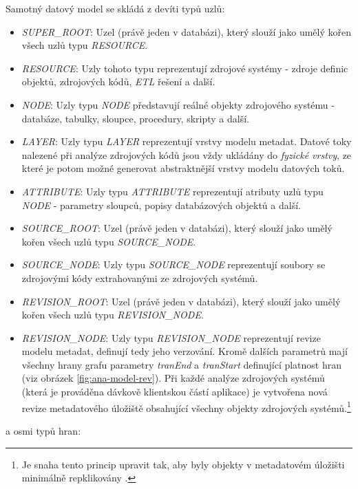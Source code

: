 Samotný datový model se skládá z devíti typů uzlů:

\begin{itemize}
	\item{\textit{SUPER\_ROOT}}: Uzel (právě jeden v databázi), který slouží jako umělý kořen všech uzlů typu \textit{RESOURCE}.
	\item{\textit{RESOURCE}}: Uzly tohoto typu reprezentují zdrojové systémy - zdroje definic objektů, zdrojových kódů, \textit{ETL} řešení a další.
	\item{\textit{NODE}}: Uzly typu \textit{NODE} představují reálné objekty zdrojového systému - databáze, tabulky, sloupce, procedury, skripty a další.
	\item{\textit{LAYER}}: Uzly typu \textit{LAYER} reprezentují vrstvy modelu metadat. Datové toky nalezené při analýze zdrojových kódů jsou vždy ukládány do \textit{fyzické vrstvy}, ze které je potom možné generovat abstraktnější vrstvy modelu datových toků.
	\item{\textit{ATTRIBUTE}}: Uzly typu \textit{ATTRIBUTE} reprezentují atributy uzlů typu \textit{NODE} - parametry sloupců, popisy databázových objektů a další.
	\item{\textit{SOURCE\_ROOT}}: Uzel (právě jeden v databázi), který slouží jako umělý kořen všech uzlů typu \textit{SOURCE\_NODE}.
	\item{\textit{SOURCE\_NODE}}: Uzly typu \textit{SOURCE\_NODE} reprezentují soubory se zdrojovými kódy extrahovanými ze zdrojových systémů.
	\item{\textit{REVISION\_ROOT}}: Uzel (právě jeden v databázi), který slouží jako umělý kořen všech uzlů typu \textit{REVISION\_NODE}.
	\item{\textit{REVISION\_NODE}}: Uzly typu \textit{REVISION\_NODE} reprezentují revize modelu metadat, definují tedy jeho verzování. Kromě dalších parametrů mají všechny hrany grafu parametry \textit{tranEnd} a \textit{tranStart} definující platnost hran (viz obrázek \ref{fig:ana-model-rev}). Při každé analýze zdrojových systémů (která je prováděna dávkově klientskou částí aplikace) je vytvořena nová revize metadatového úložiště obsahující všechny objekty zdrojových systémů.\footnote{Je snaha tento princip upravit tak, aby byly objekty v metadatovém úložišti minimálně repklikovány \cite{Sykora17}.}
\end{itemize}

 a osmi typů hran:

